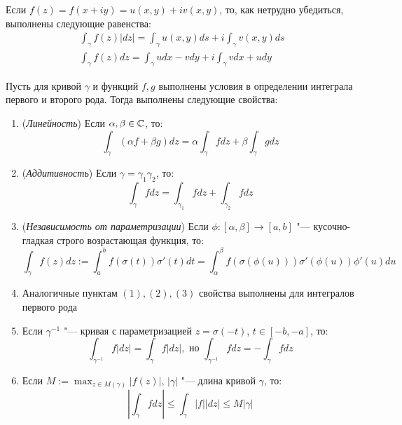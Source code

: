 \begin{note}
	Если $f(z) = f(x + iy) = u(x, y) + iv(x, y)$, то, как нетрудно убедиться, выполнены следующие равенства:
	\begin{gather*}
		\int_{\gamma}f(z)|dz| = \int_\gamma u(x, y)ds + i\int_\gamma v(x, y)ds
		\\
		\int_{\gamma}f(z)dz = \int_\gamma udx - vdy + i\int_\gamma vdx + udy
	\end{gather*}
\end{note}

\begin{theorem}
	Пусть для кривой $\gamma$ и функций $f, g$ выполнены условия в определении интеграла первого и второго рода. Тогда выполнены следующие свойства:
	\begin{enumerate}
		\item (\textit{Линейность}) Если $\alpha, \beta \in \mathbb{C}$, то:
		\[\int_{\gamma}(\alpha f+\beta g)dz = \alpha\int_\gamma fdz + \beta\int_\gamma gdz\]
		
		\item (\textit{Аддитивность}) Если $\gamma = \gamma_1\gamma_2$, то:
		\[\int_{\gamma}fdz = \int_{\gamma_1}fdz + \int_{\gamma_2}fdz\]
		
		\item (\textit{Независимость от параметризации}) Если $\phi : [\alpha, \beta] \to [a, b]$ "--- кусочно-гладкая строго возрастающая функция, то:
		\[\int_{\gamma}f(z)dz := \int_a^bf(\sigma(t))\sigma'(t)dt = \int_\alpha^\beta f(\sigma(\phi(u)))\sigma'(\phi(u))\phi'(u)du\]
		
		\item Аналогичные пунктам $(1), (2), (3)$ свойства выполнены для интегралов первого рода
		
		\item Если $\gamma^{-1}$ "--- кривая с параметризацией $z = \sigma(-t)$, $t \in [-b, -a]$, то:
		\[\int_{\gamma^{-1}}f|dz| = \int_\gamma f|dz|,\text{ но }\int_{\gamma^{-1}}fdz = -\int_\gamma fdz\]
		
		\item Если $M := \max_{z \in M(\gamma)}|f(z)|$, $|\gamma|$ "--- длина кривой $\gamma$, то:
		\[\left|\int_\gamma fdz\right| \le \int_\gamma|f||dz| \le M|\gamma|\]
	\end{enumerate}
\end{theorem}

